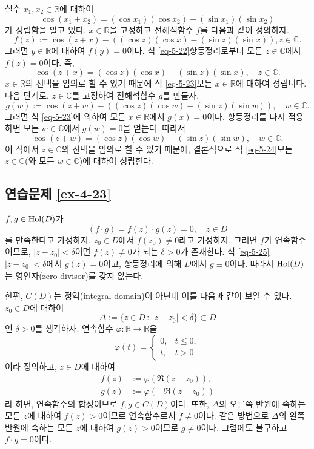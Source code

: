 실수 $x_1, x_2 \in\mathbb R$에 대하여
\begin{equation}\label{eq-5-22}
\cos (x_1 + x_2) = (\cos x_1)(\cos x_2) - (\sin x_1)(\sin x_2)
\end{equation}
가 성립함을 알고 있다.
$x\in \mathbb R$을 고정하고 전해석함수 $f$를 다음과 같이 정의하자.
\[
f(z):= \cos(z+x) - \left( (\cos z)(\cos x) - (\sin z)(\sin x) \right),
z\in\mathbb C.
\]
그러면 $y\in\mathbb R$에 대하여 $f(y)=0$이다.
식 \eqref{eq-5-22}\와 항등정리로부터
모든 $z\in\mathbb C$에서 $f(z)=0$이다.
즉,
\begin{equation}\label{eq-5-23}
\cos (z + x) = (\cos z)(\cos x) - (\sin z)(\sin x),\quad z\in\mathbb C.
\end{equation}
$x\in\mathbb R$의 선택을 임의로 할 수 있기 때문에
식 \eqref{eq-5-23}\은  모든 $x\in\mathbb R$에 대하여 성립니다.
다음 단계로, $z\in\mathbb C$를 고정하여
전해석함수 $g$를 만들자.
\[
g(w):= \cos(z+w) - \left( (\cos z)(\cos w) - (\sin z)(\sin w) \right), \quad w\in\mathbb C.
\]
그러면 식 \eqref{eq-5-23}에 의하여 
모든 $x\in\mathbb R$에서 $g(x)=0$이다.
항등정리를 다시 적용하면 모든 $w\in\mathbb C$에서 $g(w)=0$을 얻는다.
따라서
\begin{equation}\label{eq-5-24}
\cos (z+w) =  (\cos z)(\cos w) - (\sin z)(\sin w), \quad w\in\mathbb C.
\end{equation}
이 식에서 $z\in\mathbb C$의 선택을 임의로 할 수 있기 때문에,
결론적으로 식 \eqref{eq-5-24}\는 모든 $z\in\mathbb C$(와 모든 $w\in\mathbb C$)에
대하여 성립한다.

\subsection*{연습문제 \ref{ex-4-23}}

$f,g\in\mathop{\mathrm{Hol}}(D)$가
\begin{equation}\label{eq-5-25}
(f\cdot g) = f(z)\cdot g(z) = 0, \quad z\in D
\end{equation}
를 만족한다고 가정하자.
$z_0\in D$에서 $f(z_0)\ne0$라고 가정하자. 그러면
$f$가 연속함수이므로,
$|z-z_0|<\delta$이면 $f(z)\ne0$가 되는 $\delta>0$가 존재한다.
식 \eqref{eq-5-25} $|z-z_0|<\delta$에서 
$g(z)=0$이고, 항등정리에 의해 $D$에서 $g\equiv 0$이다.
따라서 $\mathop{\mathrm{Hol}}(D)$는 영인자(zero divisor)를 갖지 않는다.

한편, $C(D)$는 정역(integral domain)이 아닌데
이를 다음과 같이 보일 수 있다.
$z_0\in D$에 대하여
\[
\Delta := \{ z\in D \,:\, |z-z_0| <\delta \} \subset D
\]
인 $\delta >0$를 생각하자.
연속함수 $\varphi: \mathbb R \to \mathbb R$을
\[
\varphi(t) = \begin{cases}
0, & t\le 0, \\
t, & t>0
\end{cases}
\]
이라 정의하고, $z\in D$에 대하여
\begin{align*}
f(z) &:=  \varphi(\Re(z-z_0)), \\
g(z) &:=  \varphi(-\Re(z-z_0))
\end{align*}
라 하면, 
연속함수의 합성이므로 $ f, g\in C(D)$이다.
또한, $\Delta$의 오른쪽 반원에 속하는 모든 $z$에 대하여 $f(z)>0$이므로
연속함수로서 $f\ne0$이다. 같은 방법으로 
$\Delta$의 왼쪽 반원에 속하는 모든 $z$에 대하여 $g(z)>0$이므로
$g\ne0$이다. 그럼에도 불구하고 $f\cdot g=0$이다.

